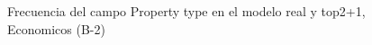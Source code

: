 \begin{figure}[H]
    \centering
    
    \caption{Frecuencia del campo Property type en el modelo real y top2+1, Economicos (B-2)}
    \label{frecuency-Property Type-top2+1}
\end{figure}